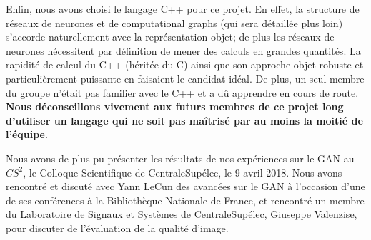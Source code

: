 Enfin, nous avons choisi le langage C++ pour ce projet. En effet, la structure de réseaux de neurones et de computational graphs (qui sera détaillée plus loin) s'accorde naturellement avec la représentation objet; de plus les réseaux de neurones nécessitent par définition de mener des calculs en grandes quantités. La rapidité de calcul du C++ (héritée du C) ainsi que son approche objet robuste et particulièrement puissante en faisaient le candidat idéal. De plus, un seul membre du groupe n'était pas familier avec le C++ et a dû apprendre en cours de route. \textbf{Nous déconseillons vivement aux futurs membres de ce projet long d'utiliser un langage qui ne soit pas maîtrisé par au moins la moitié de l'équipe}. 

Nous avons de plus pu présenter les résultats de nos expériences sur le GAN au $CS^2$, le Colloque Scientifique de CentraleSupélec, le 9 avril 2018. Nous avons rencontré et discuté avec Yann LeCun des avancées sur le GAN à l'occasion d'une de ses conférences à la Bibliothèque Nationale de France, et rencontré un membre du Laboratoire de Signaux et Systèmes de CentraleSupélec, Giuseppe Valenzise, pour discuter de l'évaluation de la qualité d'image.
\newpage
